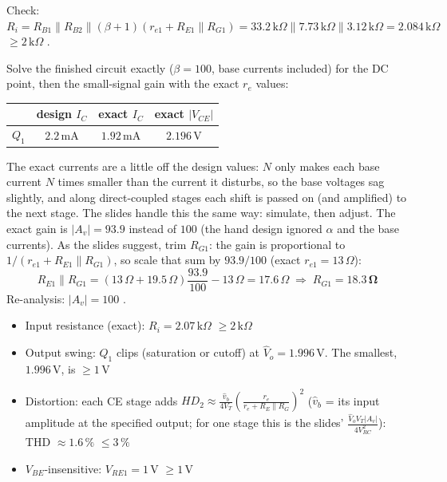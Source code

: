 \documentclass[11pt]{article}
\newcommand{\solstep}[2]{\par\medskip{\color{stepc}\textbf{Step #1 --- #2}}\par\nopagebreak}
\begin{document}
Check: $R_i = R_{B1}\|R_{B2}\|(\beta+1)(r_{e1} + R_{E1}\|R_{G1}) = 33.2\,\mathrm{k}\Omega\|7.73\,\mathrm{k}\Omega\|3.12\,\mathrm{k}\Omega = 2.084\,\mathrm{k}\Omega$ $\ge 2\,\mathrm{k}\Omega$ \checkmark.
\solstep{4}{Check by analysis}Solve the finished circuit exactly ($\beta=100$, base currents included) for the DC point, then the small-signal gain with the exact $r_e$ values:\begin{center}\renewcommand{\arraystretch}{1.35}
\begin{tabular}{cccc}
\toprule
 & design $I_C$ & exact $I_C$ & exact $|V_{CE}|$ \\
\midrule
$Q_{1}$ & $2.2\,\mathrm{m}\mathrm{A}$ & $1.92\,\mathrm{m}\mathrm{A}$ & $2.196\,\mathrm{V}$ \\
\bottomrule
\end{tabular}\end{center}
The exact currents are a little off the design values: $N$ only makes each base current $N$ times smaller than the current it disturbs, so the base voltages sag slightly, and along direct-coupled stages each shift is passed on (and amplified) to the next stage. The slides handle this the same way: simulate, then adjust. The exact gain is $|A_v| = 93.9$ instead of $100$ (the hand design ignored $\alpha$ and the base currents). As the slides suggest, trim $R_{G1}$: the gain is proportional to $1/(r_{e1} + R_{E1}\|R_{G1})$, so scale that sum by $93.9/100$ (exact $r_{e1} = 13\,\Omega$):\[R_{E1}\|R_{G1} = (13\,\Omega + 19.5\,\Omega)\frac{93.9}{100} - 13\,\Omega = 17.6\,\Omega \;\Rightarrow\; R_{G1} = \mathbf{18.3\,\Omega}\]Re-analysis: $|A_v| = 100$ \checkmark. \begin{itemize}[leftmargin=*,itemsep=2pt]
\item Input resistance (exact): $R_i = 2.07\,\mathrm{k}\Omega$ $\ge 2\,\mathrm{k}\Omega$ \checkmark
\item Output swing: $Q_{1}$ clips (saturation or cutoff) at $\hat V_o = 1.996\,\mathrm{V}$. The smallest, $1.996\,\mathrm{V}$, is $\ge 1$\,V \checkmark
\item Distortion: each CE stage adds $HD_2 \approx \frac{\hat v_b}{4V_T}\left(\frac{r_e}{r_e + R_E\|R_G}\right)^2$ ($\hat v_b$ = its input amplitude at the specified output; for one stage this is the slides' $\frac{\hat V_o V_T |A_v|}{4V_{RC}^2}$): THD $\approx 1.6\,\%$ $\le 3\,\%$ \checkmark
\item $V_{BE}$-insensitive: $V_{RE1} = 1$\,V $\ge 1$\,V \checkmark
\end{itemize}
\end{document}
